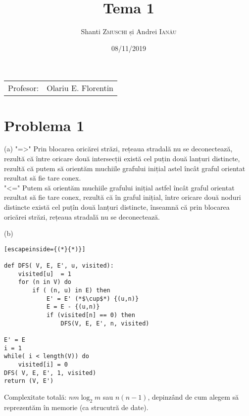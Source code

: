 \documentclass{article}
\title{Tema 1} %
\author{Shanti \textsc{Zmuschi} și Andrei \textsc{Ianău}} %
\date{08/11/2019}
\begin{document}
\maketitle %

\begin{center}
\begin{tabular}{l r}
Profesor: &  Olariu E. Florentin \\ %
\end{tabular}
\end{center}




\section*{Problema 1}
(a)
"=\textgreater" Prin blocarea oricărei străzi, rețeaua stradală nu se deconectează, rezultă că între oricare două intersecții 
există cel puțin două lanțuri distincte, rezultă că putem să orientăm muchiile grafului inițial astel încât graful orientat rezultat să fie tare conex.\\

"\textless=" Putem să orientăm muchiile grafului inițial astfel încât graful orientat rezultat să fie tare conex, rezultă că în graful inițial, între oricare două noduri distincte există cel puțîn două lanțuri distincte, înseamnă că prin blocarea oricărei străzi, rețeaua stradală nu se deconectează.

(b)
\begin{lstlisting}[escapeinside={(*}{*)}]
 
def DFS( V, E, E', u, visited):
	visited[u]  = 1
	for (n in V) do
		if ( (n, u) in E) then 
			E' = E' (*$\cup$*) {(u,n)}
			E = E - {(u,n)}
			if (visited[n] == 0) then
				DFS(V, E, E', n, visited)

E' = E
i = 1
while( i < length(V)) do
	visited[i] = 0
DFS( V, E, E', 1, visited)
return (V, E')
\end{lstlisting}
Complexitate  totală: $nm\log_2 m$ sau $n(n-1)$, depinzând de cum alegem să reprezentăm în memorie (ca strucutră de date).
\end{document}
